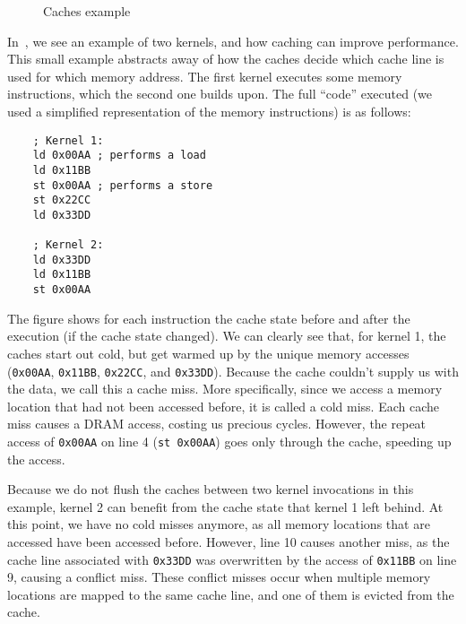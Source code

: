 \begin{figure}[hbt]
    \centering
    \caption{Caches example}
    \label{fig:normal-exec}
\end{figure}

In~, we see an example of two kernels, and how caching can improve performance.
This small example abstracts away of how the caches decide which cache line is used for which memory address.
The first kernel executes some memory instructions, which the second one builds upon.
The full ``code'' executed (we used a simplified representation of the memory instructions) is as follows:
\begin{verbatim}
    ; Kernel 1:
    ld 0x00AA ; performs a load
    ld 0x11BB
    st 0x00AA ; performs a store
    st 0x22CC
    ld 0x33DD

    ; Kernel 2:
    ld 0x33DD
    ld 0x11BB
    st 0x00AA
\end{verbatim}

The figure shows for each instruction the cache state before and after the execution (if the cache state changed).
We can clearly see that, for kernel 1, the caches start out cold, but get warmed up by the unique memory accesses (\verb|0x00AA|, \verb|0x11BB|, \verb|0x22CC|, and \verb|0x33DD|).
Because the cache couldn't supply us with the data, we call this a cache miss.
More specifically, since we access a memory location that had not been accessed before, it is called a cold miss.
Each cache miss causes a DRAM access, costing us precious cycles.
However, the repeat access of \verb|0x00AA| on line 4 (\texttt{st 0x00AA}) goes only through the cache, speeding up the access.

Because we do not flush the caches between two kernel invocations in this example, kernel 2 can benefit from the cache state that kernel 1 left behind.
At this point, we have no cold misses anymore, as all memory locations that are accessed have been accessed before.
However, line 10 causes another miss, as the cache line associated with \verb|0x33DD| was overwritten by the access of \verb|0x11BB| on line 9, causing a conflict miss.
These conflict misses occur when multiple memory locations are mapped to the same cache line, and one of them is evicted from the cache.

